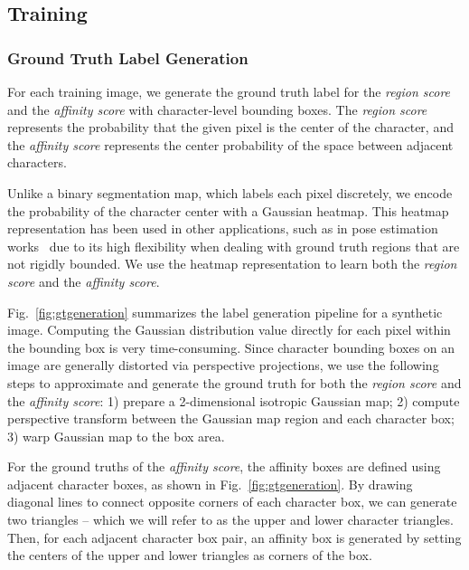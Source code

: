 \documentclass[10pt,twocolumn,letterpaper]{article}
\begin{document}
\subsection{Training} 

\subsubsection{Ground Truth Label Generation}

For each training image, we generate the ground truth label for the \textit{region score} and the \textit{affinity score} with character-level bounding boxes. 
The \textit{region score} represents the probability that the given pixel is the center of the character, and the \textit{affinity score} represents the center probability of the space between adjacent characters. 

Unlike a binary segmentation map, which labels each pixel discretely, we encode the probability of the character center with a Gaussian heatmap.
This heatmap representation has been used in other applications, such as in pose estimation works~\cite{cao2017realtime,newell2016stacked} due to its high flexibility when dealing with ground truth regions that are not rigidly bounded. We use the heatmap representation to learn both the \textit{region score} and the \textit{affinity score}.


Fig.~\ref{fig:gtgeneration} summarizes the label generation pipeline for a synthetic image. Computing the Gaussian distribution value directly for each pixel within the bounding box is very time-consuming. Since character bounding boxes on an image are generally distorted via perspective projections, we use the following steps to approximate and generate the ground truth for both the \textit{region score} and the \textit{affinity score}: 
1) prepare a 2-dimensional isotropic Gaussian map;
2) compute perspective transform between the Gaussian map region and each character box;
3) warp Gaussian map to the box area.

For the ground truths of the \textit{affinity score}, the affinity boxes are defined using adjacent character boxes, as shown in Fig.~\ref{fig:gtgeneration}.
By drawing diagonal lines to connect opposite corners of each character box, we can generate two triangles -- which we will refer to as the upper and lower character triangles.
Then, for each adjacent character box pair, an affinity box is generated by setting the centers of the upper and lower triangles as corners of the box.
\end{document}
